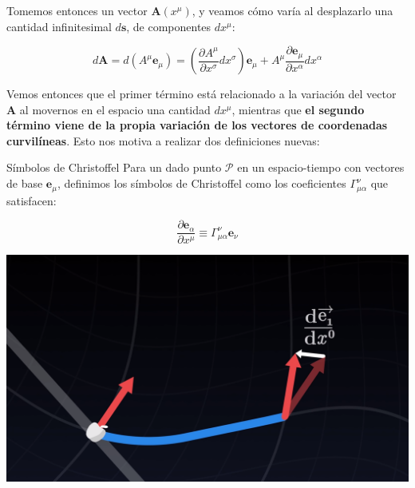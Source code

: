 Tomemos entonces un vector $\mathbf{A}(x^\mu)$, y veamos cómo varía al desplazarlo una cantidad infinitesimal $d\mathbf{s}$, de componentes $dx^\mu$:

\begin{equation}
d\mathbf{A}=d(A^\mu \mathbf{e}_{\mu})=\left(\frac{\partial A^{\mu}}{\partial x^{\sigma}}dx^\sigma \right)\mathbf{e}_{\mu}+A^\mu\frac{\partial \mathbf{e}_{\mu}}{\partial x^\alpha}dx^\alpha
\end{equation}

Vemos entonces que el primer término está relacionado a la variación del vector $\mathbf{A}$ al movernos en el espacio una cantidad $dx^{\mu}$, mientras que \textbf{el segundo término viene de la propia variación de los vectores de coordenadas curvilíneas}. Esto nos motiva a realizar dos definiciones nuevas:

\begin{remarkbox}{Símbolos de Christoffel}
Para un dado punto $\mathcal{P}$ en un espacio-tiempo con vectores de base $\mathbf{e}_{\mu}$, definimos los símbolos de Christoffel como los coeficientes $\Gamma^\nu_{\mu\alpha}$ que satisfacen:

\begin{equation}
    \frac{\partial \mathbf{e}_{\alpha}}{\partial x^{\mu}}\equiv \Gamma^\nu_{\mu\alpha} \mathbf{e}_{\nu}
\end{equation}

\end{remarkbox}

\begin{marginfigure}
\captionsetup{type=figure}
    \centering
    \includegraphics[width=1.3\textwidth]{Im/parallel.png}
    \caption{Transporte paralelo de un vector. Restando los vectores de cada punta obtenemos cómo cambia uno de los vectores de la base al variar la otra coordenada.}
    \label{fig:sen}
\end{marginfigure}

